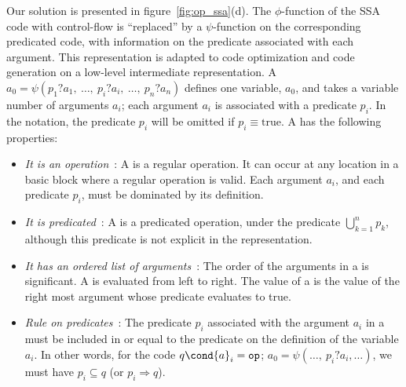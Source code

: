 Our solution is presented in figure~\ref{fig:op_ssa}(d). The $\phi$-function of the SSA code with control-flow
 is ``replaced'' by a $\psi$-function on the corresponding predicated code, with information on the
predicate associated with each argument. This representation is
adapted to code optimization and code generation on a low-level
intermediate representation.
%
A \psifun ${a_0 = \psi({p}_1?{a}_1,\ \dots,\ {p}_i?{a}_i,\
  \dots,\ {p}_n?{a}_n)}$ defines one variable, ${a_0}$,
and takes a variable number of arguments ${a_i}$; each
argument ${a_i}$ is associated with a predicate ${p_i}$. In
the notation, the predicate ${p_i}$ will be omitted if
${p_i} \equiv \textrm{true}$.
\newpage
A \psifun has the following properties:
\begin{itemize}

\item{\emph{It is an operation}}~: A \psifun is a regular operation. It
  can occur at any location in a basic block where a regular operation
  is valid. Each argument ${a_i}$, and each predicate ${p_i}$,
  must be dominated by its definition.

\item{\emph{It is predicated}}~: A \psifun is a predicated
  operation, under the predicate ${\bigcup_{k=1}^n p_k}$,
  although this predicate is not explicit in the representation.

\item{\emph{It has an ordered list of arguments}}~: The order of the
  arguments in a \psifun is significant. A \psifun is
  evaluated from left to right. The value of a \psifun is the
  value of the right most argument whose predicate evaluates to true.

\item{\emph{Rule on predicates}}~: The predicate ${p_i}$ associated
  with the argument ${a_i}$ in a \psifun must be included
  in or equal to the predicate on the definition of the variable ${a_i}$.
In other words, for the code $q\cond {a}_i = \texttt{op}$;  ${a}_0 = {\psi}(\dots,\ {p}_i?{a}_i,\dots)$, we must have 
${p}_i \subseteq {q}$ (or $p_i \Rightarrow q$).

\end{itemize}


